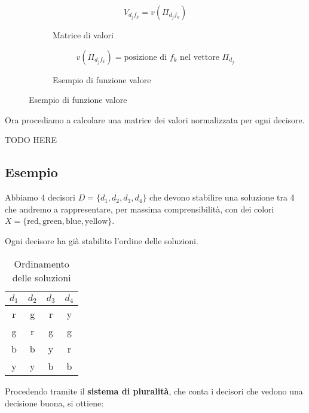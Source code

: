 \documentclass[\main/main.tex]{subfiles}
\begin{document}
\begin{figure}
	\begin{subfigure}{0.45\textwidth}
		\[
			V_{d_{j}f_{k}} = v(\Pi_{d_{j}f_{k}})
		\]
		\caption{Matrice di valori}
	\end{subfigure}
	\begin{subfigure}{0.45\textwidth}
		\[
			v(\Pi_{d_{j}f_{k}}) = \text{posizione di }f_{k}\text{ nel vettore }\Pi_{d_{j}}
		\]
		\caption{Esempio di funzione valore}
	\end{subfigure}
\end{figure}

Ora procediamo a calcolare una matrice dei valori normalizzata per ogni decisore.

TODO HERE

\subsection{Esempio}
Abbiamo 4 decisori $D = \{d_1, d_2, d_3, d_4 \}$ che devono stabilire una soluzione tra 4 che andremo a rappresentare, per massima comprensibilità, con dei colori $X = \{ \text{red}, \text{green}, \text{blue}, \text{yellow}\}$.

Ogni decisore ha già stabilito l'ordine delle soluzioni.

\begin{table}
	\begin{tabular}{|c|c|c|c|}
		\hline
		\rowcolor{gray!10} $d_1$ & $d_2$                   & $d_3$                   & $d_4$                   \\
		\hline
		\cellcolor{red!50} r     & \cellcolor{green!50} g  & \cellcolor{red!50} r    & \cellcolor{yellow!50} y \\
		\hline
		\cellcolor{green!50} g   & \cellcolor{red!50} r    & \cellcolor{green!50} g  & \cellcolor{green!50} g  \\
		\hline
		\cellcolor{blue!50} b    & \cellcolor{blue!50} b   & \cellcolor{yellow!50} y & \cellcolor{red!50} r    \\
		\hline
		\cellcolor{yellow!50} y  & \cellcolor{yellow!50} y & \cellcolor{blue!50} b   & \cellcolor{blue!50} b   \\
		\hline
	\end{tabular}
	\caption{Ordinamento delle soluzioni}
	\label{not_influenced_example}
\end{table}

Procedendo tramite il \textbf{sistema di pluralità}, che conta i decisori che vedono una decisione buona, si ottiene:
\end{document}
